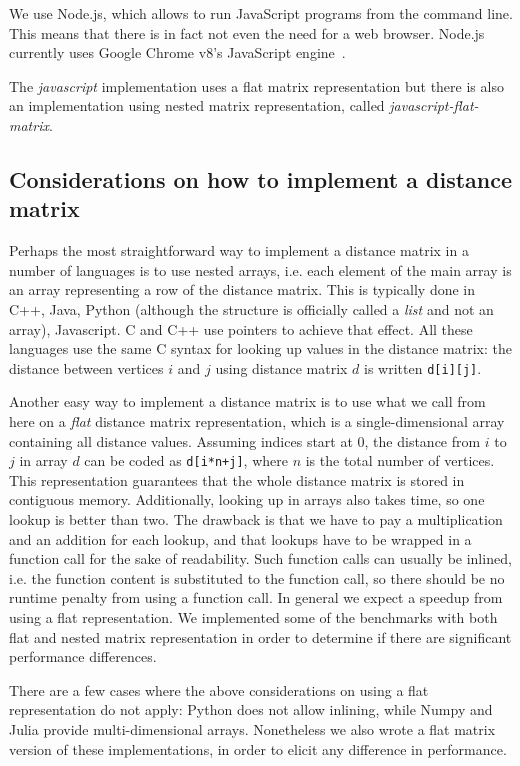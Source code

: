 \documentclass[11pt,a4paper,notitlepage]{article}
\begin{document}
We use Node.js, which allows to run JavaScript programs from the
command line. This means that there is in fact not even the need for a
web browser. Node.js currently uses Google Chrome v8's JavaScript
engine~\cite{nodejs}.

The \emph{javascript} implementation uses a flat matrix representation
but there is also an implementation using nested matrix representation,
called \emph{javascript-flat-matrix}.

\subsection{Considerations on how to implement a distance matrix}
Perhaps the most straightforward way to implement a distance matrix in
a number of languages is to use nested arrays, i.e. each element of the
main array is an array representing a row of the distance matrix. This
is typically done in C++, Java, Python (although the structure is
officially called a \emph{list} and not an array), Javascript. C and
C++ use pointers to achieve that effect. All these languages use the
same C syntax for looking up values in the distance matrix: the
distance between vertices $i$ and $j$ using distance matrix $d$ is
written \lstinline{d[i][j]}.

Another easy way to implement a distance matrix is to use what we
call from here on a \emph{flat} distance matrix representation, which
is a single-dimensional array containing all distance values. Assuming
indices start at 0, the distance from $i$ to $j$ in array $d$ can be
coded as \lstinline{d[i*n+j]}, where $n$ is the total number of
vertices. This representation guarantees that the whole distance
matrix is stored in contiguous memory. Additionally, looking up in
arrays also takes time, so one lookup is better than two. The drawback
is that we have to pay a multiplication and an addition for each
lookup, and that lookups have to be wrapped in a function call for the
sake of readability. Such function calls can usually be inlined,
i.e. the function content is substituted to the function call, so
there should be no runtime penalty from using a function call. In
general we expect a speedup from using a flat representation. We
implemented some of the benchmarks with both flat and nested matrix
representation in order to determine if there are significant
performance differences.

There are a few cases where the above considerations on using a flat
representation do not apply: Python does not allow inlining, while
Numpy and Julia provide multi-dimensional arrays. Nonetheless we also
wrote a flat matrix version of these implementations, in order
to elicit any difference in performance. 
\end{document}

